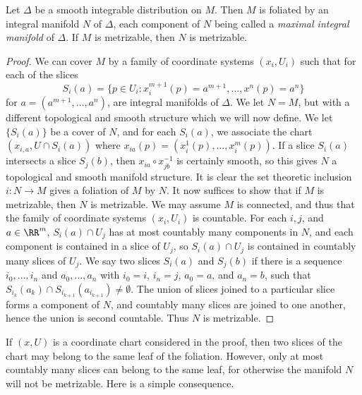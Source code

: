 \begin{theorem}
    Let $\Delta$ be a smooth integrable distribution on $M$. Then $M$ is foliated by an integral manifold $N$ of $\Delta$, each component of $N$ being called a \emph{maximal integral manifold} of $\Delta$. If $M$ is metrizable, then $N$ is metrizable.
\end{theorem}
\begin{proof}
    We can cover $M$ by a family of coordinate systems $(x_i,U_i)$ such that for each of the slices
    \[ S_i(a) = \{ p \in U_i: x_i^{m+1}(p) = a^{m+1}, \dots, x^n(p) = a^n \} \]
    for $a = (a^{m+1}, \dots, a^n)$, are integral manifolds of $\Delta$. We let $N = M$, but with a different topological and smooth structure which we will now define. We let $\{ S_i(a) \}$ be a cover of $N$, and for each $S_i(a)$, we associate the chart $(x_{i,a}, U \cap S_i(a))$ where $x_{ia}(p) = (x_i^1(p), \dots, x_i^m(p))$. If a slice $S_i(a)$ intersects a slice $S_j(b)$, then $x_{ia} \circ x_{jb}^{-1}$ is certainly smooth, so this gives $N$ a topological and smooth manifold structure. It is clear the set theoretic inclusion $i: N \to M$ gives a foliation of $M$ by $N$. It now suffices to show that if $M$ is metrizable, then $N$ is metrizable. We may assume $M$ is connected, and thus that the family of coordinate systems $(x_i,U_i)$ is countable. For each $i,j$, and $a \in \RR^m$, $S_i(a) \cap U_j$ has at most countably many components in $N$, and each component is contained in a slice of $U_j$, so $S_i(a) \cap U_j$ is contained in countably many slices of $U_j$. We say two slices $S_i(a)$ and $S_j(b)$ if there is a sequence $i_0, \dots, i_n$ and $a_0, \dots, a_n$ with $i_0 = i$, $i_n = j$, $a_0 = a$, and $a_n = b$, such that $S_{i_k}(a_k) \cap S_{i_{k+1}}(a_{i_{k+1}}) \neq \emptyset$. The union of slices joined to a particular slice forms a component of $N$, and countably many slices are joined to one another, hence the union is second countable. Thus $N$ is metrizable.
\end{proof}

If $(x,U)$ is a coordinate chart considered in the proof, then two slices of the chart may belong to the same leaf of the foliation. However, only at most countably many slices can belong to the same leaf, for otherwise the manifold $N$ will not be metrizable. Here is a simple consequence.

